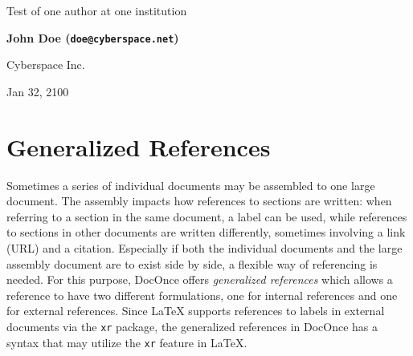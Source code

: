 \documentclass[%
oneside,                 %
final,                   %
chapterprefix=true,      %
open=right,              %
10pt]{book}
\begin{document}

\newcommand{\exercisesection}[1]{\subsection*{#1}}








\thispagestyle{empty}

\begin{center}
{\LARGE\bf
\begin{spacing}{1.25}
Test of one author at one institution
\end{spacing}
}
\end{center}


\begin{center}
{\bf John Doe (\texttt{doe@cyberspace.net})}
\end{center}

    \begin{center}
\centerline{{\small Cyberspace Inc.}}
\end{center}
    

\begin{center}
Jan 32, 2100
\end{center}

\vspace{1cm}



\chapter{Generalized References}
\label{genrefs}

Sometimes a series of individual documents may be assembled to one
large document. The assembly impacts how references to sections
are written: when referring to a section in the same document, a label
can be used, while references to sections in other documents are
written differently, sometimes involving a link (URL) and a citation.
Especially if both the individual documents and the large assembly document
are to exist side by side, a flexible way of referencing is needed.
For this purpose, DocOnce offers \emph{generalized references} which allows
a reference to have two different formulations, one for internal
references and one for external references. Since {\LaTeX} supports
references to labels in external documents via the \texttt{xr} package,
the generalized references in DocOnce has a syntax that may utilize
the \texttt{xr} feature in {\LaTeX}.
\end{document}
